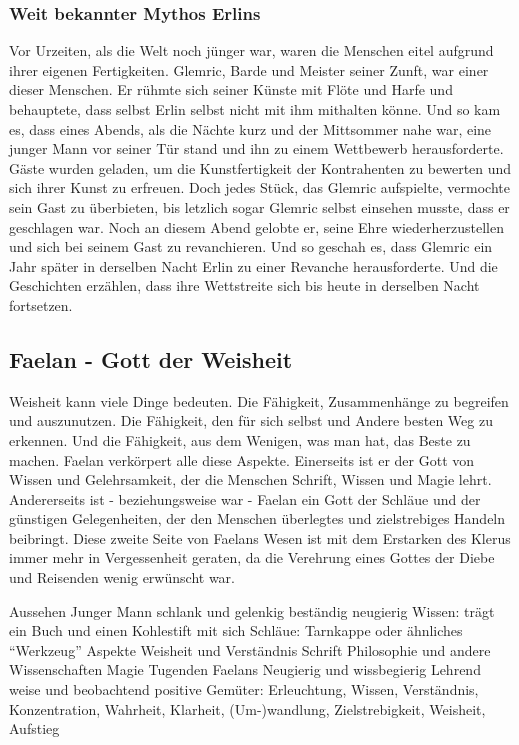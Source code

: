 \subsubsection{Weit bekannter Mythos Erlins}
Vor Urzeiten, als die Welt noch jünger war, waren die Menschen eitel aufgrund ihrer eigenen Fertigkeiten. 
Glemric, Barde und Meister seiner Zunft, war einer dieser Menschen. 
Er rühmte sich seiner Künste mit Flöte und Harfe und behauptete, dass selbst Erlin selbst nicht mit ihm mithalten könne.
Und so kam es, dass eines Abends, als die Nächte kurz und der Mittsommer nahe war, eine junger Mann vor seiner Tür stand und ihn zu einem Wettbewerb herausforderte. 
Gäste wurden geladen, um die Kunstfertigkeit der Kontrahenten zu bewerten und sich ihrer Kunst zu erfreuen. 
Doch jedes Stück, das Glemric aufspielte, vermochte sein Gast zu überbieten, bis letzlich sogar Glemric selbst einsehen musste, dass er geschlagen war. 
Noch an diesem Abend gelobte er, seine Ehre wiederherzustellen und sich bei seinem Gast zu revanchieren. 
Und so geschah es, dass Glemric ein Jahr später in derselben Nacht Erlin zu einer Revanche herausforderte. 
Und die Geschichten erzählen, dass ihre Wettstreite sich bis heute in derselben Nacht fortsetzen.




\subsection{Faelan - Gott der Weisheit}
Weisheit kann viele Dinge bedeuten. 
Die Fähigkeit, Zusammenhänge zu begreifen und auszunutzen. 
Die Fähigkeit, den für sich selbst und Andere besten Weg zu erkennen. 
Und die Fähigkeit, aus dem Wenigen, was man hat, das Beste zu machen. 
Faelan verkörpert alle diese Aspekte. 
Einerseits ist er der Gott von Wissen und Gelehrsamkeit, der die Menschen Schrift, Wissen und Magie lehrt. 
Andererseits ist - beziehungsweise war - Faelan ein Gott der Schläue und der günstigen Gelegenheiten, der den Menschen überlegtes und zielstrebiges Handeln beibringt. 
Diese zweite Seite von Faelans Wesen ist mit dem Erstarken des Klerus immer mehr in Vergessenheit geraten, da die Verehrung eines Gottes der Diebe und Reisenden wenig erwünscht war.
\begin{outline}
	\1 Aussehen 
		\2 Junger Mann 
		\2 schlank und gelenkig
		\2 beständig neugierig
		\2 Wissen: trägt ein Buch und einen Kohlestift mit sich
		\2 Schläue: Tarnkappe oder ähnliches ``Werkzeug''
	\1 Aspekte
		\2 Weisheit und Verständnis
		\2 Schrift
		\2 Philosophie und andere Wissenschaften
		\2 Magie
	\1 Tugenden Faelans
		\2 Neugierig und wissbegierig
		\2 Lehrend
		\2 weise und beobachtend
	\1 positive Gemüter: Erleuchtung, Wissen, Verständnis, Konzentration, Wahrheit, Klarheit, (Um-)wandlung, Zielstrebigkeit, Weisheit, Aufstieg
\end{outline}

